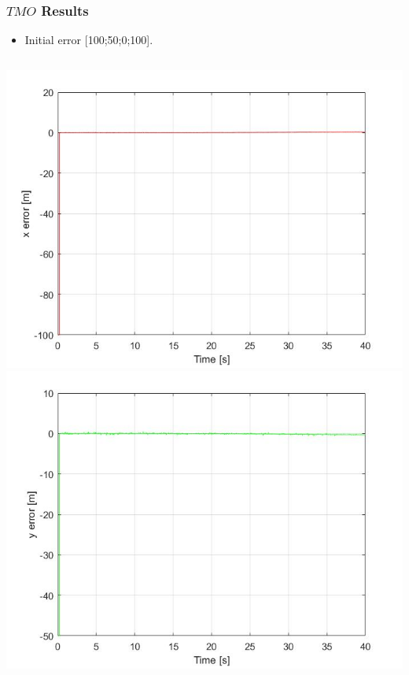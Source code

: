 \documentclass{beamer}
\begin{document}
	\begin{frame}
		\frametitle{$TMO$ Results}
		\begin{itemize}
			\item Initial error [100;50;0;100].
		\end{itemize}
		\begin{columns}[t]
			\centering
			\includegraphics[scale=0.18]{nlo_x_3}\\
			\includegraphics[scale=0.18]{nlo_y_3}
			\centering

\end{columns}
\end{frame}
\end{document}
